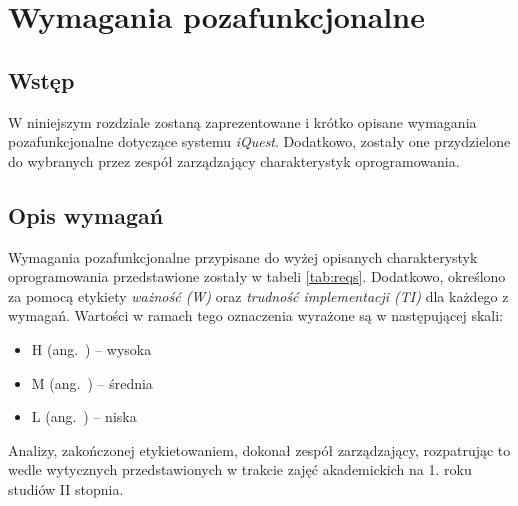 \chapter{Wymagania pozafunkcjonalne}
\label{Chapter4}

\section{Wstęp}
\label{Chapter41}

W niniejszym rozdziale zostaną zaprezentowane i krótko opisane wymagania pozafunkcjonalne dotyczące systemu \textit{iQuest}. Dodatkowo, zostały one przydzielone do wybranych przez zespół zarządzający charakterystyk oprogramowania.

\section{Opis wymagań}
\label{Chapter43}

Wymagania pozafunkcjonalne przypisane do wyżej opisanych charakterystyk oprogramowania przedstawione zostały w tabeli \ref{tab:reqs}. Dodatkowo, określono za pomocą etykiety \emph{ważność (W)} oraz \emph{trudność implementacji (TI)} dla każdego z wymagań. Wartości w ramach tego oznaczenia wyrażone są w następującej skali:

\begin{itemize}
\item{H (ang.~) -- wysoka}
\item{M (ang.~) -- średnia}
\item{L (ang.~) -- niska}
\end{itemize}

Analizy, zakończonej etykietowaniem, dokonał zespół zarządzający, rozpatrując to wedle wytycznych przedstawionych w trakcie zajęć akademickich na 1. roku studiów II stopnia.

